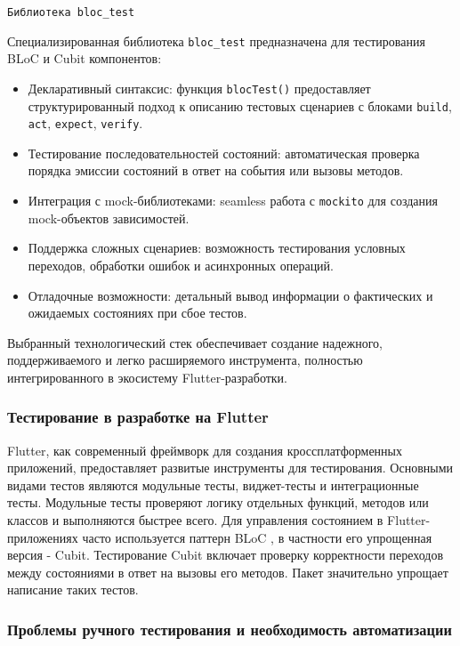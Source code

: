 \documentclass[14pt, russian]{scrartcl}
\begin{document}
\texttt{Библиотека bloc\_test} 

Специализированная библиотека \texttt{bloc\_test} предназначена для тестирования BLoC и Cubit компонентов:
\begin{itemize}
    \item Декларативный синтаксис: функция \texttt{blocTest()} предоставляет структурированный подход к описанию тестовых сценариев с блоками \texttt{build}, \texttt{act}, \texttt{expect}, \texttt{verify}.
    \item Тестирование последовательностей состояний: автоматическая проверка порядка эмиссии состояний в ответ на события или вызовы методов.
    \item Интеграция с mock-библиотеками: seamless работа с \texttt{mockito} для создания mock-объектов зависимостей.
    \item Поддержка сложных сценариев: возможность тестирования условных переходов, обработки ошибок и асинхронных операций.
    \item Отладочные возможности: детальный вывод информации о фактических и ожидаемых состояниях при сбое тестов.
\end{itemize}

Выбранный технологический стек обеспечивает создание надежного, поддерживаемого и легко расширяемого инструмента, полностью интегрированного в экосистему Flutter-разработки.


\subsubsection{Тестирование в разработке на Flutter}
Flutter, как современный фреймворк для создания кроссплатформенных приложений, предоставляет развитые инструменты для тестирования. Основными видами тестов являются модульные  тесты, виджет-тесты и интеграционные тесты. Модульные тесты проверяют логику отдельных функций, методов или классов и выполняются быстрее всего. Для управления состоянием в Flutter-приложениях часто используется паттерн BLoC , в частности его упрощенная версия - Cubit. Тестирование Cubit включает проверку корректности переходов между состояниями в ответ на вызовы его методов. Пакет  значительно упрощает написание таких тестов.

\subsubsection{Проблемы ручного тестирования и необходимость автоматизации}
\end{document}
